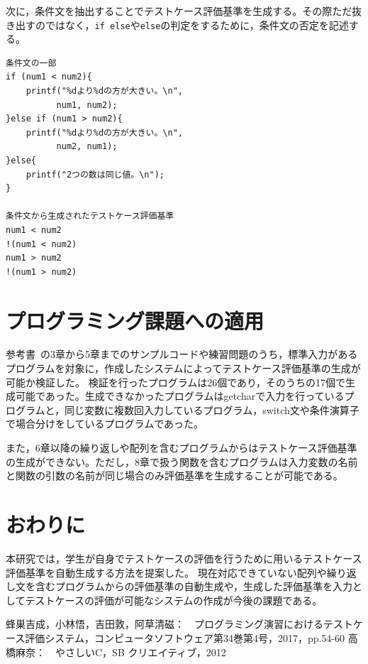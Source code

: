 \documentclass[10pt]{tpu-abst}
\begin{document}
次に，条件文を抽出することでテストケース評価基準を生成する。その際ただ抜き出すのではなく，{\tt if else}や{\tt else}の判定をするために，条件文の否定を記述する。 
\begin{lstlisting}
条件文の一部
if (num1 < num2){
	printf("%dより%dの方が大きい。\n", 
		  num1, num2);
}else if (num1 > num2){
	printf("%dより%dの方が大きい。\n",
		  num2, num1);
}else{
	printf("2つの数は同じ値。\n");
}

条件文から生成されたテストケース評価基準
num1 < num2
!(num1 < num2)
num1 > num2
!(num1 > num2)
\end{lstlisting}
\section{プログラミング課題への適用}
参考書~\cite{b1}の3章から5章までのサンプルコードや練習問題のうち，標準入力があるプログラムを対象に，作成したシステムによってテストケース評価基準の生成が可能か検証した。
検証を行ったプログラムは26個であり，そのうちの17個で生成可能であった。生成できなかったプログラムはgetcharで入力を行っているプログラムと，同じ変数に複数回入力しているプログラム，switch文や条件演算子で場合分けをしているプログラムであった。

また，6章以降の繰り返しや配列を含むプログラムからはテストケース評価基準の生成ができない。ただし，8章で扱う関数を含むプログラムは入力変数の名前と関数の引数の名前が同じ場合のみ評価基準を生成することが可能である。

\section{おわりに}
本研究では，学生が自身でテストケースの評価を行うために用いるテストケース評価基準を自動生成する方法を提案した。
現在対応できていない配列や繰り返し文を含むプログラムからの評価基準の自動生成や，生成した評価基準を入力としてテストケースの評価が可能なシステムの作成が今後の課題である。

\begin{thebibliography}{2}
  {\small 蜂巣吉成，小林悟，吉田敦，阿草清磁：　プログラミング演習におけるテストケース評価システム，コンピュータソフトウェア第34巻第4号，2017，pp.54-60}
  {\small 高橋麻奈：　やさしいC，SB クリエイティブ，2012}
\end{thebibliography}
%
\end{document}
